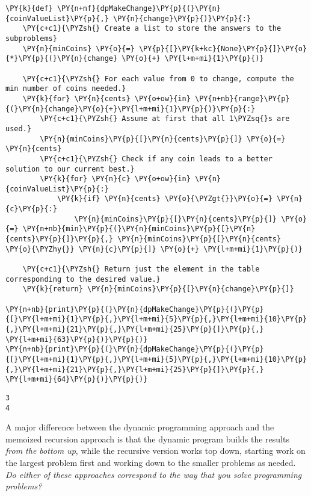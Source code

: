 \begin{Verbatim}[commandchars=\\\{\}]
\PY{k}{def} \PY{n+nf}{dpMakeChange}\PY{p}{(}\PY{n}{coinValueList}\PY{p}{,} \PY{n}{change}\PY{p}{)}\PY{p}{:}
    \PY{c+c1}{\PYZsh{} Create a list to store the answers to the subproblems}
    \PY{n}{minCoins} \PY{o}{=} \PY{p}{[}\PY{k+kc}{None}\PY{p}{]}\PY{o}{*}\PY{p}{(}\PY{n}{change} \PY{o}{+} \PY{l+m+mi}{1}\PY{p}{)}

    \PY{c+c1}{\PYZsh{} For each value from 0 to change, compute the min number of coins needed.}
    \PY{k}{for} \PY{n}{cents} \PY{o+ow}{in} \PY{n+nb}{range}\PY{p}{(}\PY{n}{change}\PY{o}{+}\PY{l+m+mi}{1}\PY{p}{)}\PY{p}{:}
        \PY{c+c1}{\PYZsh{} Assume at first that all 1\PYZsq{}s are used.}
        \PY{n}{minCoins}\PY{p}{[}\PY{n}{cents}\PY{p}{]} \PY{o}{=} \PY{n}{cents}
        \PY{c+c1}{\PYZsh{} Check if any coin leads to a better solution to our current best.}
        \PY{k}{for} \PY{n}{c} \PY{o+ow}{in} \PY{n}{coinValueList}\PY{p}{:}
            \PY{k}{if} \PY{n}{cents} \PY{o}{\PYZgt{}}\PY{o}{=} \PY{n}{c}\PY{p}{:}
                \PY{n}{minCoins}\PY{p}{[}\PY{n}{cents}\PY{p}{]} \PY{o}{=} \PY{n+nb}{min}\PY{p}{(}\PY{n}{minCoins}\PY{p}{[}\PY{n}{cents}\PY{p}{]}\PY{p}{,} \PY{n}{minCoins}\PY{p}{[}\PY{n}{cents} \PY{o}{\PYZhy{}} \PY{n}{c}\PY{p}{]} \PY{o}{+} \PY{l+m+mi}{1}\PY{p}{)}

    \PY{c+c1}{\PYZsh{} Return just the element in the table corresponding to the desired value.}
    \PY{k}{return} \PY{n}{minCoins}\PY{p}{[}\PY{n}{change}\PY{p}{]}

\PY{n+nb}{print}\PY{p}{(}\PY{n}{dpMakeChange}\PY{p}{(}\PY{p}{[}\PY{l+m+mi}{1}\PY{p}{,}\PY{l+m+mi}{5}\PY{p}{,}\PY{l+m+mi}{10}\PY{p}{,}\PY{l+m+mi}{21}\PY{p}{,}\PY{l+m+mi}{25}\PY{p}{]}\PY{p}{,} \PY{l+m+mi}{63}\PY{p}{)}\PY{p}{)}
\PY{n+nb}{print}\PY{p}{(}\PY{n}{dpMakeChange}\PY{p}{(}\PY{p}{[}\PY{l+m+mi}{1}\PY{p}{,}\PY{l+m+mi}{5}\PY{p}{,}\PY{l+m+mi}{10}\PY{p}{,}\PY{l+m+mi}{21}\PY{p}{,}\PY{l+m+mi}{25}\PY{p}{]}\PY{p}{,} \PY{l+m+mi}{64}\PY{p}{)}\PY{p}{)}
\end{Verbatim}

\begin{Verbatim}
3
4
\end{Verbatim}


A major difference between the dynamic programming approach and the memoized recursion approach is that the dynamic program builds the results \emph{from the bottom up}, while the recursive version works top down, starting work on the largest problem first and working down to the smaller problems as needed.
\emph{Do either of these approaches correspond to the way that you solve programming problems?}

